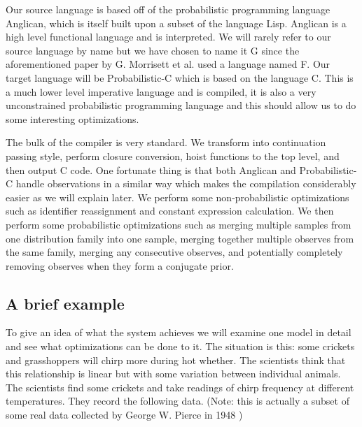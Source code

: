 \documentclass[a4paper]{article}
\begin{document}
Our source language is based off of the probabilistic programming language Anglican, which is itself built upon a subset of the language Lisp. Anglican is a high level functional language and is interpreted. We will rarely refer to our source language by name but we have chosen to name it G since the aforementioned paper by G. Morrisett et al. used a language named F. Our target language will be Probabilistic-C which is based on the language C. This is a much lower level imperative language and is compiled, it is also a very unconstrained probabilistic programming language and this should allow us to do some interesting optimizations.

The bulk of the compiler is very standard. We transform into continuation passing style, perform closure conversion, hoist functions to the top level, and then output C code. One fortunate thing is that both Anglican and Probabilistic-C handle observations in a similar way which makes the compilation considerably easier as we will explain later. We perform some non-probabilistic optimizations such as identifier reassignment and constant expression calculation. We then perform some probabilistic optimizations such as merging multiple samples from one distribution family into one sample, merging together multiple observes from the same family, merging any consecutive observes, and potentially completely removing observes when they form a conjugate prior.




\subsection{A brief example}

To give an idea of what the system achieves we will examine one model in detail and see what optimizations can be done to it. The situation is this: some crickets and grasshoppers will chirp more during hot whether. The scientists think that this relationship is linear but with some variation between individual animals. The scientists find some crickets and take readings of chirp frequency at different temperatures. They record the following data. (Note: this is actually a subset of some real data collected by George W. Pierce in 1948 \cite{Crickets})
\end{document}
